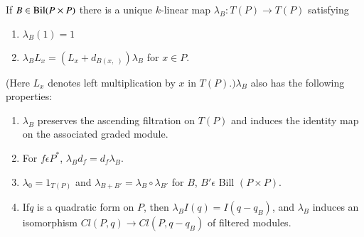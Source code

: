 \begin{lemma}%
If $B \in \operatorname{Bil} (P \times P)$ there is a unique $k$-linear map
$\lambda_B : T(P) \to T(P)$ satisfying  
\begin{enumerate}[{\rm(i)}]
\item $\lambda_B (1) = 1$

\item $\lambda_B L_x = (L_x + d_{B(x,\; )}) \lambda_B $ for $x \in P$. 
\end{enumerate}
(Here $L_x$ denotes left multiplication by $x$ in $T(P).) \lambda_B$
also has the following properties: 
\begin{enumerate}[{\rm(a)}]
\item $\lambda_B$ preserves the ascending filtration on $T(P)$
  and induces the identity map on the associated graded module. 

\item For $f \epsilon P^*$, $\lambda_B d_f=d_f \lambda_B$.

\item $\lambda_0 = 1_{T(P)}$ and $\lambda_{B+B'} = \lambda_B \circ
  \lambda_{B'}$ for $B$, ${B'} \epsilon $ Bill $(P \times P)$. 

\item If\pageoriginale $q$ is a quadratic form on $P$, then $\lambda_B
  I(q) = I(q-q_B)$, and $\lambda_B$ induces an isomorphism $Cl (P,
  q) \to Cl(P, q-q_B)$ of filtered modules. 
\end{enumerate}
\end{lemma}

